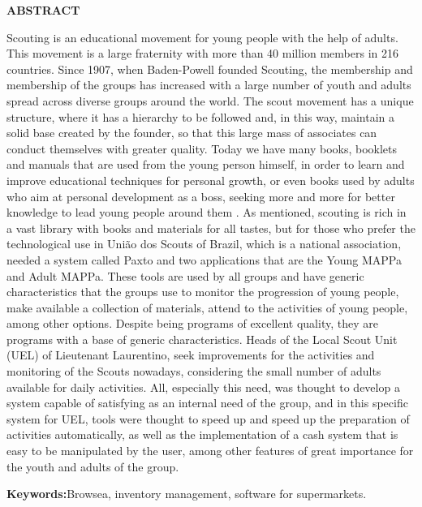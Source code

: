 \begin{center}
\Large{\textbf{ABSTRACT}}
\end{center}
Scouting is an educational movement for young people with the help of adults. This movement is a large fraternity with more than 40 million members in 216 countries. Since 1907, when Baden-Powell founded Scouting, the membership and membership of the groups has increased with a large number of youth and adults spread across diverse groups around the world. The scout movement has a unique structure, where it has a hierarchy to be followed and, in this way, maintain a solid base created by the founder, so that this large mass of associates can conduct themselves with greater quality. Today we have many books, booklets and manuals that are used from the young person himself, in order to learn and improve educational techniques for personal growth, or even books used by adults who aim at personal development as a boss, seeking more and more for better knowledge to lead young people around them . As mentioned, scouting is rich in a vast library with books and materials for all tastes, but for those who prefer the technological use in União dos Scouts of Brazil, which is a national association, needed a system called Paxto and two applications that are the Young MAPPa and Adult MAPPa. These tools are used by all groups and have generic characteristics that the groups use to monitor the progression of young people, make available a collection of materials, attend to the activities of young people, among other options. Despite being programs of excellent quality, they are programs with a base of generic characteristics. Heads of the Local Scout Unit (UEL) of Lieutenant Laurentino, seek improvements for the activities and monitoring of the Scouts nowadays, considering the small number of adults available for daily activities. All, especially this need, was thought to develop a system capable of satisfying as an internal need of the group, and in this specific system for UEL, tools were thought to speed up and speed up the preparation of activities automatically, as well as the implementation of a cash system that is easy to be manipulated by the user, among other features of great importance for the youth and adults of the group.

\vspace{7cm}
\textbf{Keywords:}\hspace*{0.2cm}Browsea, inventory management, software for supermarkets.
